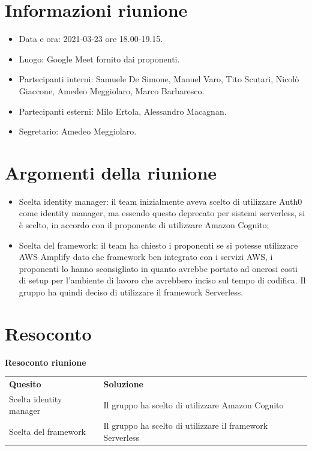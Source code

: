 \documentclass[a4paper]{article}
\begin{document}
\newpage
\tableofcontents
\newpage

\section{Informazioni riunione}
\begin{itemize}
    \item Data e ora: 2021-03-23 ore 18.00-19.15.
    \item Luogo: Google Meet fornito dai proponenti.
    \item Partecipanti interni: Samuele De Simone, Manuel Varo, Tito Scutari, Nicolò Giaccone, Amedeo Meggiolaro, Marco Barbaresco.
    \item Partecipanti esterni: Milo Ertola, Alessandro Macagnan.
    \item Segretario: Amedeo Meggiolaro.
\end{itemize}
\section{Argomenti della riunione}
\begin{itemize}
    \item Scelta identity manager: il team inizialmente aveva scelto di utilizzare Auth0 come identity manager, ma essendo questo deprecato per sistemi serverless, si è scelto, in accordo con il proponente di utilizzare Amazon Cognito;
    \item Scelta del framework: il team ha chiesto i proponenti se si potesse utilizzare AWS Amplify dato che framework ben integrato con i servizi AWS, i proponenti lo hanno sconsigliato in quanto avrebbe portato ad onerosi costi di setup per l'ambiente di lavoro che avrebbero inciso sul tempo di codifica. Il gruppo ha quindi deciso di utilizzare il framework Serverless.
\end{itemize}
\section{Resoconto}
\begin{center}
    \textbf{\Large Resoconto riunione}\\
    \vspace{10px}
    \begin{table}[h!]
        \centering
        \renewcommand{\arraystretch}{1.8}
        \begin{tabular}{p{150px} p{150px}}
            \rowcolor{logo!70} \textbf{Quesito} & \textbf{Soluzione}                                        \\
            Scelta identity manager             & Il gruppo ha scelto di utilizzare Amazon Cognito          \\
            Scelta del framework                & Il gruppo ha scelto di utilizzare il framework Serverless \\
        \end{tabular}
    \end{table}
\end{center}
\end{document}
